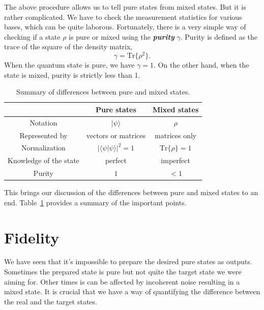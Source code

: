 The above procedure allows us to tell pure states from mixed states.
But it is rather complicated.
We have to check the measurement statistics for various bases, which can be quite laborous.
Fortunately, there is a very simple way of checking if a state $\rho$ is pure or mixed using the \textit{\textbf{purity}} $\gamma$.
Purity is defined as the trace of the square of the density matrix,
\begin{equation}
    \gamma = \text{Tr} \{ \rho^2 \}.
\end{equation}
When the quantum state is pure, we have $\gamma=1$.
On the other hand, when the state is mixed, purity is strictly less than 1.

\begin{table}[t]
    \centering
    \begin{tabular}{c|c|c}
         & Pure states & Mixed states \\
         \hline
        Notation & $|\psi\rangle$ & $\rho$ \\
        Represented by & vectors or matrices & matrices only \\
        Normalization & $|\langle\psi|\psi\rangle|^2=1$ & $\text{Tr}\{\rho\}=1$ \\
        Knowledge of the state & perfect & imperfect \\
        Purity & $1$ & $<1$ \\
    \end{tabular}
    \caption[Pure versus mixed states]{Summary of differences between pure and mixed states.}
    \label{tab:3-4_pure_vs_mixed}
\end{table}

This brings our discussion of the differences between pure and mixed states to an end.
Table~\ref{tab:3-4_pure_vs_mixed} provides a summary of the important points.




\section{Fidelity}
\label{sec:3-5_fidelity}

We have seen that it's impossible to prepare the desired pure states as outputs.
Sometimes the prepared state is pure but not quite the target state we were aiming for.
Other times is can be affected by incoherent noise resulting in a mixed state.
It is crucial that we have a way of quantifying the difference between the real and the target states.


